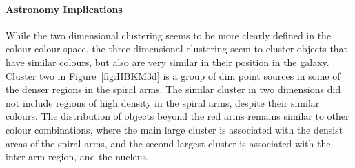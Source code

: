 \paragraph{Astronomy Implications}
While the two dimensional clustering seems to be more clearly defined in the colour-colour space, the three dimensional clustering seem to cluster objects that have similar colours, but also are very similar in their position in the galaxy.
Cluster two in Figure~\ref{fig:HBKM3d} is a group of dim point sources in some of the denser regions in the spiral arms. 
The similar cluster in two dimensions did not include regions of high density in the spiral arms, despite their similar colours.
The distribution of objects beyond the red arms remains similar to other colour combinations, where the main large cluster is associated with the densist areas of the spiral arms, and the second largest cluster is associated with the inter-arm region, and the nucleus.









